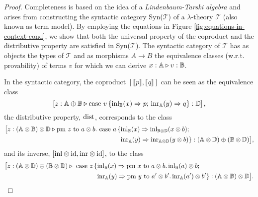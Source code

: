 \documentclass[10pt,a4paper]{amsart}
\theoremstyle{definition}
\theoremstyle{definition}
\theoremstyle{definition}
\theoremstyle{definition}
\theoremstyle{definition}
\theoremstyle{definition}
\begin{document}
\begin{proof}
  Completeness is based on the idea of a \textit{Lindenbaum-Tarski algebra} and arises from constructing the syntactic category Syn($\mathscr{T}$) of a $\lambda$-theory $\mathscr{T}$ (also known as term model). By employing the equations in Figure \ref{fig:equations-in-context-cond}, we show that both the universal property of the coproduct and the distributive property are satisfied in Syn($\mathscr{T}$). The syntactic category of $\mathscr{T}$ has as objects the types of $\mathscr{T}$ and as morphisms $A \rightarrow B$ the equivalence classes (w.r.t. provability) of terms $v$ for which we can derive $x : \mathbb{A} \triangleright v : \mathbb{B}$.

  In the syntactic category, the coproduct $[\llbracket p \rrbracket, \llbracket q \rrbracket]$ can be seen as the equivalence
  class 
  $$\left[z:\mathbb{A} \oplus\mathbb{B} \triangleright \text{case } v\,\{\mathrm{inl}_{\mathbb{B}}(x) \Rightarrow p ; \, \mathrm{inr}_{\mathbb{A}}(y) \Rightarrow q\}: \mathbb{D}\right],$$ 
  the distributive property, $\mathrm{dist}$, corresponds to the class 
  \begin{align*}
    \big[z:(\mathbb{A} \otimes \mathbb{\mathbb{B}}) \otimes \mathbb{\mathbb{D}} \triangleright \text{pm } z \text{ to } a \otimes b. \text{ case } a\,\{ &\mathrm{inl}_{\mathbb{B}}(x) \Rightarrow \mathrm{inl}_{\mathbb{B} \otimes \mathbb{D}}(x \otimes b); \\
    & \mathrm{inr}_{\mathbb{A}}(y) \Rightarrow \mathrm{inr}_{\mathbb{A} \otimes \mathbb{D}} (y \otimes b)\}: (\mathbb{A} \otimes \mathbb{D}) \oplus (\mathbb{B} \otimes \mathbb{D})\big],
  \end{align*}
and its inverse, $[\mathrm{inl} \otimes \mathrm{id}, \mathrm{inr} \otimes \mathrm{id}]$, to the class
\begin{align*}
  \big[z: (\mathbb{A} \otimes \mathbb{D}) \oplus (\mathbb{B} \otimes \mathbb{D}) \triangleright  \text{ case } z \,\{ &\mathrm{inl}_{\mathbb{B}}(x) \Rightarrow \text{pm } x \text{ to } a \otimes b. \, \mathrm{inl}_{\mathbb{B}}(a) \otimes b; \\
  & \mathrm{inr}_{\mathbb{A}}(y) \Rightarrow \text{pm } y \text{ to } a' \otimes b'. \, \mathrm{inr}_{\mathbb{A}}(a') \otimes b'\}: (\mathbb{A} \otimes \mathbb{\mathbb{B}}) \otimes \mathbb{\mathbb{D}}\big].
\end{align*}



\end{proof}
\end{document}
